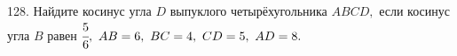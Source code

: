 128. Найдите косинус угла $D$ выпуклого четырёхугольника $ABCD,$ если косинус угла $B$ равен $\cfrac{5}{6},\ AB=6,\ BC=4,\ CD=5,\ AD=8.$\\
